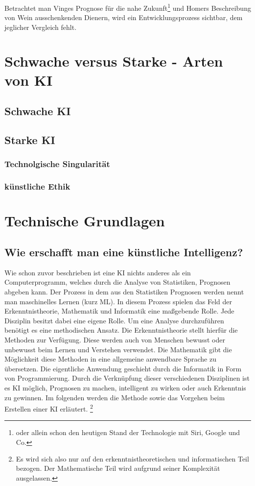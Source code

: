 \documentclass[12pt,german,ngerman]{report}
\begin{document}
Betrachtet man Vinges Prognose für die nahe Zukunft\footnote{oder allein schon den heutigen Stand der Technologie mit Siri, Google und Co.} und 
Homers Beschreibung von Wein ausschenkenden Dienern,
wird ein Entwicklungsprozess sichtbar, dem jeglicher Vergleich fehlt. 



\chapter{Schwache versus Starke - Arten von KI}
     
    \section{Schwache KI}
        \subsection{}
    \section{Starke KI}
        \subsection{Technolgische Singularität}
        \subsection{künstliche Ethik}

\chapter{Technische Grundlagen}
    \section{Wie erschafft man eine künstliche Intelligenz?}
        Wie schon zuvor beschrieben ist eine KI nichts anderes als ein Computerprogramm,
        welches durch die Analyse von Statistiken, Prognosen abgeben kann.
        Der Prozess in dem aus den Statistiken Prognosen werden nennt man maschinelles Lernen (kurz ML).
        In diesem Prozess spielen das Feld der Erkenntnistheorie, Mathematik und Informatik 
        eine maßgebende Rolle. Jede Disziplin besitzt dabei eine eigene Rolle. 
        Um eine Analyse durchzuführen benötigt es eine methodischen Ansatz.
        Die Erkenntnistheorie stellt hierfür die Methoden zur Verfügung. Diese werden auch von 
        Menschen bewusst oder unbewusst beim Lernen und Verstehen verwendet. Die Mathematik
        gibt die Möglichkeit diese Methoden in eine allgemeine anwendbare Sprache zu übersetzen.
        Die eigentliche Anwendung geschieht durch die Informatik in Form von Programmierung.
        Durch die Verknüpfung dieser verschiedenen Disziplinen ist es KI möglich,
        Prognosen zu machen, intelligent zu wirken oder auch Erkenntnis zu gewinnen.
        Im folgenden werden die Methode sowie das Vorgehen beim Erstellen einer KI erläutert.
        \footnote{Es wird sich also nur auf den erkenntnistheoretischen und informatischen Teil bezogen. 
        Der Mathematische Teil wird aufgrund seiner Komplexität ausgelassen.}
\end{document}
